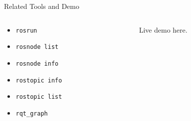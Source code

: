 \documentclass{beamer}
\begin{document}
\begin{frame}{Related Tools and Demo}
	\begin{columns}
		\begin{column}{0.3\textwidth}
			\begin{itemize}
				\item \texttt{rosrun}
				\item \texttt{rosnode list}
				\item \texttt{rosnode info}
				\item \texttt{rostopic info}
				\item \texttt{rostopic list}
				\item \texttt{rqt_graph}
			\end{itemize}
		\end{column}
		\begin{column}{0.7\textwidth}
			\centering
			Live demo here.
		\end{column}
	\end{columns}
\end{frame}
\end{document}
